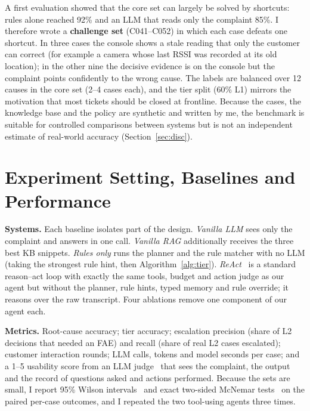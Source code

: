 \documentclass[12pt,a4paper]{article}
\begin{document}
A first evaluation showed that the core set can largely be solved by shortcuts: rules alone reached 92\% and an LLM
that reads only the complaint 85\%. I therefore wrote a \textbf{challenge set} (C041--C052) in which each case
defeats one shortcut. In three cases the console shows a stale reading that only the customer can correct (for
example a camera whose last RSSI was recorded at its old location); in the other nine the decisive evidence is on
the console but the complaint points confidently to the wrong cause. The labels are balanced over 12 causes in the
core set (2--4 cases each), and the tier split (60\% L1) mirrors the motivation that most tickets should be closed
at frontline. Because the cases, the knowledge base and the policy are synthetic and written by me, the benchmark is
suitable for controlled comparisons between systems but is not an independent estimate of real-world accuracy
(Section~\ref{sec:disc}).

\section{Experiment Setting, Baselines and Performance}
\textbf{Systems.} Each baseline isolates part of the design. \emph{Vanilla LLM} sees only the complaint and answers in
one call. \emph{Vanilla RAG} additionally receives the three best KB snippets. \emph{Rules only} runs the planner and
the rule matcher with no LLM (taking the strongest rule hint, then Algorithm~\ref{alg:tier}). \emph{ReAct}~\cite{react}
is a standard reason--act loop with exactly the same tools, budget and action judge as our agent but without the
planner, rule hints, typed memory and rule override; it reasons over the raw transcript. Four ablations remove one
component of our agent each.

\textbf{Metrics.} Root-cause accuracy; tier accuracy; escalation precision (share of L2 decisions that needed an FAE)
and recall (share of real L2 cases escalated); customer interaction rounds; LLM calls, tokens and model seconds per
case; and a 1--5 usability score from an LLM judge~\cite{llmjudge} that sees the complaint, the output and the
record of questions asked and actions performed. Because the sets are small, I report 95\% Wilson
intervals~\cite{wilson} and exact two-sided McNemar tests~\cite{mcnemar} on the paired per-case outcomes, and I
repeated the two tool-using agents three times.
\end{document}
